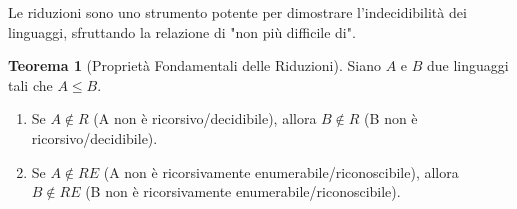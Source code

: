 \documentclass[a4paper]{article}
\theoremstyle{definition} %
\newtheorem{theorem}{Teorema}
[section] %
\begin{document}
Le riduzioni sono uno strumento potente per dimostrare l'indecidibilità dei linguaggi, sfruttando la relazione di "non più difficile di".

\begin{theorem}[Proprietà Fondamentali delle Riduzioni]
\label{thm:proprieta-riduzioni}
Siano $A$ e $B$ due linguaggi tali che $A \le B$.
\begin{enumerate}
    \item Se $A \notin R$ (A non è ricorsivo/decidibile), allora $B \notin R$ (B non è ricorsivo/decidibile).
    \item Se $A \notin RE$ (A non è ricorsivamente enumerabile/riconoscibile), allora $B \notin RE$ (B non è ricorsivamente enumerabile/riconoscibile).
\end{enumerate}
\end{theorem}
\end{document}
